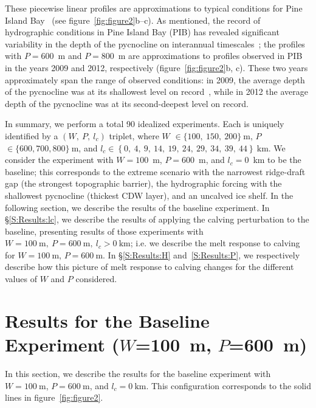 \documentclass[draft]{agujournal2019}
\begin{document}
These piecewise linear profiles are approximations to typical conditions for Pine Island Bay~\cite{Jacobs1996GRL, Dutrieux2014Science, Jenkins2018NatureGeo} (see figure~\ref{fig:figure2}b--c). As mentioned, the record of hydrographic conditions in Pine Island Bay (PIB) has revealed significant variability in the depth of the pycnocline on interannual timescales~\cite{Dutrieux2014Science}; the profiles with $P=600$~m and $P=800$~m are approximations to profiles observed in PIB in the years 2009 and 2012, respectively (figure~\ref{fig:figure2}b, c). These two years approximately span the range of observed conditions: in 2009, the average depth of the pycnocline was at its shallowest level on record~\cite{Webber2017NatureComms}, while in 2012 the average depth of the pycnocline was at its second-deepest level on record.

In summary, we perform a total 90 idealized experiments. Each is uniquely identified by a $(W,~P,~l_c)$ triplet, where $W$ $\in \{100,~150,~200\}~\text{m}$, $P$ $\in \{600, 700, 800\}~\text{m}$, and $l_c \in \left\{0,~4,~9,~14,~19,~24,~29,~34,~39,~44\right\}~\text{km}$. We consider the experiment with $W=100$~m, $P=600$~m, and $l_c=0$~km to be the baseline; this corresponds to the extreme scenario with the narrowest ridge-draft gap (the strongest topographic barrier), the hydrographic forcing with the shallowest pycnocline (thickest CDW layer), and an uncalved ice shelf. In the following section, we describe the results of the baseline experiment. In \S\ref{S:Results:lc}, we describe the results of applying the calving perturbation to the baseline, presenting results of those experiments with  $W=100~\text{m},~P=600~\text{m},~l_c>0~\text{km}$; i.e. we describe the melt response to calving for $W=100~\text{m}$, $P = 600~\text{m}$. In \S\ref{S:Results:H} and~\ref{S:Results:P}, we respectively describe how this picture of melt response to calving changes for the different values of $W$ and $P$ considered.


\section{Results for the Baseline Experiment ($W$=100~m, $P$=600~m)}\label{S:Baseline}
In this section, we describe the results for the baseline experiment with $W=100~\text{m}$, $P=600~\text{m}$, and $l_c=0~\text{km}$. This configuration corresponds to the solid lines in figure~\ref{fig:figure2}.
\end{document}
